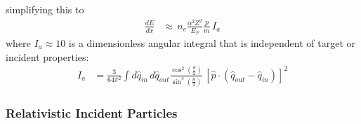 simplifying this to
\begin{align}
  \frac{dE}{dx} &\approx \, n_e \frac{\alpha^2 Z^2}{E_F} \frac{p}{m} \, I_a
\end{align}
where $I_a \approx 10$ is a dimensionless angular integral that is independent of target or incident properties:
\begin{align}
   I_a &= \frac{3}{64\pi^2} \int d\hat{q}_{in} \, d\hat{q}_{out}
   \frac{\cos^2\left(\frac{\theta}{2}\right)}
        {\sin^4\left(\frac{\theta}{2}\right)}
   \, \left[\hat{p} \cdot \left(\hat{q}_{out} - \hat{q}_{in}\right)\right]^2
\end{align}

\subsubsection{Relativistic Incident Particles}

